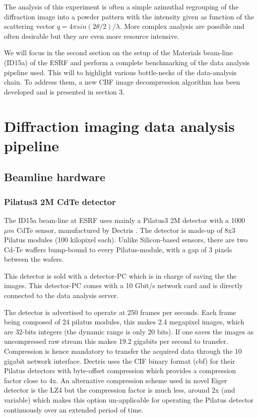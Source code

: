\documentclass[preprint, pdf]{iucr}              %
\begin{document}
The analysis of this experiment is often a simple azimuthal regrouping of the
diffraction image into a powder pattern with the intensity given as function of
the scattering vector $q=4 \pi sin (2\theta/2)/\lambda$. 
More complex analysis are possible and often desirable but they are even more
resource intensive.

We will focus in the second section on the setup of the Materials beam-line
(ID15a) of the ESRF and perform a complete benchmarking of the data analysis 
pipeline used. This will to highlight various bottle-necks of the data-analysis
chain.
To address them, a new CBF image decompression algorithm has been developed and
is presented in section 3. 

\section{Diffraction imaging data analysis pipeline}

\subsection{Beamline hardware}

\subsubsection{Pilatus3 2M CdTe detector}

The ID15a beam-line at ESRF uses mainly a Pilatus3 2M detector with a 1000 $\mu
m$ CdTe sensor, manufactured by Dectris \cite{dectris}. 
The detector is made-up of 8x3 Pilatus modules (100 kilopixel each).
Unlike Silicon-based sensors, there are two Cd-Te waffers bump-bound to every
Pilatus-module, with a gap of 3 pixels between the wafers.

This detector is sold with a detector-PC which is in charge of saving the
the images. 
This detector-PC comes with a 10 Gbit/s network card and is directly connected
to the data analysis server.

The detector is advertised to operate at 250 frames per seconds. 
Each frame being composed of 24 pilatus modules, this makes 2.4 megapixel
images, which are 32-bits integers (the dynamic range is only 20 bits).
If one saves the images as uncompressed raw stream this makes 19.2 gigabits per
second to transfer.
Compression is hence mandatory to transfer the acquired data through the 10
gigabit network interface.
Dectris uses the CIF binary format (cbf) for their Pilatus detectors with
byte-offset compression which provides a compression factor close to 4x. 
An alternative compression scheme used in novel Eiger detector is the LZ4 but
the compression factor is much less, around 2x (and variable) which makes
this option un-applicable for operating the Pilatus detector continuously over
an extended period of time.
\end{document}
